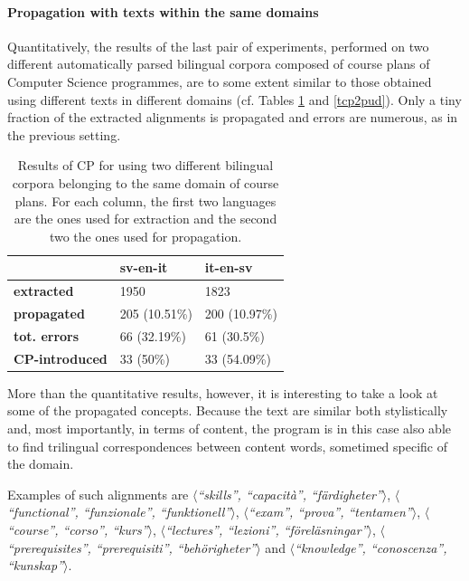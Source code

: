 \paragraph{Propagation with texts within the same domains}

Quantitatively, the results of the last pair of experiments, performed on two different automatically parsed bilingual corpora composed of course plans of Computer Science programmes, are to some extent similar to those obtained using different texts in different domains (cf. Tables \ref{tcp2courses} and \ref{tcp2pud}). Only a tiny fraction of the extracted alignments is propagated and errors are numerous, as in the previous setting. 

\begin{table}[H]
    \centering
    \begin{tabular}{|l|l|l|}
    \hline
                           & \textbf{sv-en-it} & \textbf{it-en-sv} \\ \hline
    \textbf{extracted}     & 1950              & 1823              \\ \hline
    \textbf{propagated}             & 205 (10.51\%)     & 200 (10.97\%)     \\ \hline
    \textbf{tot. errors}            & 66 (32.19\%)      & 61 (30.5\%)       \\ \hline
    \textbf{CP-introduced} & 33 (50\%)        & 33 (54.09\%)      \\ \hline
    \end{tabular}
    \caption[Performance of CP Scenario 2 on automatically parsed homogeneous data]{Results of CP for using two different bilingual corpora belonging to the same domain of course plans. For each column, the first two languages are the ones used for extraction and the second two the ones used for propagation.}
    \label{tcp2courses}
    \end{table}

    More than the quantitative results, however, it is interesting to take a look at some of the propagated concepts. Because the text are similar both stylistically and, most importantly, in terms of content, the program is in this case also able to find trilingual correspondences between content words, sometimed specific of the domain. 
    
    Examples of such alignments are $\langle$\textit{``skills'', ``capacità'', ``färdigheter''}$\rangle$, $\langle$\textit{``functional'', ``funzionale'', ``funktionell''}$\rangle$, $\langle$\textit{``exam'', ``prova'', ``tentamen''}$\rangle$, $\langle$\textit{``course'', ``corso'', ``kurs''}$\rangle$, $\langle$\textit{``lectures'', ``lezioni'', ``föreläsningar''}$\rangle$, $\langle$\textit{``prerequisites'', ``prerequisiti'', ``behörigheter''}$\rangle$ and $\langle$\textit{``knowledge'', ``conoscenza'', ``kunskap''}$\rangle$. \smallskip

